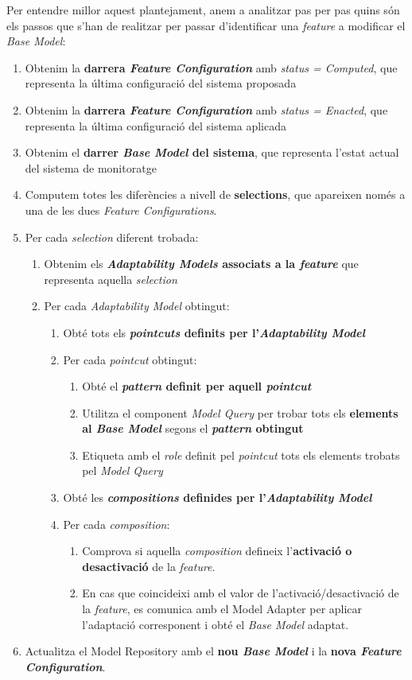 Per entendre millor aquest plantejament, anem a analitzar pas per pas quins són els passos que s'han de realitzar per passar d'identificar una \textit{feature} a modificar el \textit{Base Model}:

\begin{enumerate}
\item Obtenim la \textbf{darrera \textit{Feature Configuration}} amb \textit{status = Computed}, que representa la última configuració del sistema proposada
\item Obtenim la \textbf{darrera \textit{Feature Configuration}} amb \textit{status = Enacted}, que representa la última configuració del sistema aplicada
\item Obtenim el \textbf{darrer \textit{Base Model} del sistema}, que representa l'estat actual del sistema de monitoratge
\item Computem totes les diferències a nivell de \textbf{selections}, que apareixen només a una de les dues \textit{Feature Configurations}.
\item Per cada \textit{selection} diferent trobada:
\begin{enumerate}
\item Obtenim els \textbf{\textit{Adaptability Models} associats a la \textit{feature}} que representa aquella \textit{selection}
\item Per cada \textit{Adaptability Model} obtingut:
\begin{enumerate}
\item Obté tots els \textbf{\textit{pointcuts} definits per l'\textit{Adaptability Model}}
\item Per cada \textit{pointcut} obtingut:
\begin{enumerate}
\item Obté el \textbf{\textit{pattern} definit per aquell \textit{pointcut}}
\item Utilitza el component \textit{Model Query} per trobar tots els \textbf{elements al \textit{Base Model}} segons el \textbf{\textit{pattern} obtingut}
\item Etiqueta amb el \textit{role} definit pel \textit{pointcut} tots els elements trobats pel \textit{Model Query}
\end{enumerate}
\item Obté les \textbf{\textit{compositions} definides per l'\textit{Adaptability Model}}
\item Per cada \textit{composition}:
\begin{enumerate}
\item Comprova si aquella \textit{composition} defineix l'\textbf{activació o desactivació} de la \textit{feature}. 
\item En cas que coincideixi amb el valor de l'activació/desactivació de la \textit{feature}, es comunica amb el Model Adapter per aplicar l'adaptació corresponent i obté el \textit{Base Model} adaptat.
\end{enumerate}
\end{enumerate}
\end{enumerate}
\item Actualitza el Model Repository amb el \textbf{nou \textit{Base Model}} i la \textbf{nova \textit{Feature Configuration}}.
\end{enumerate}


